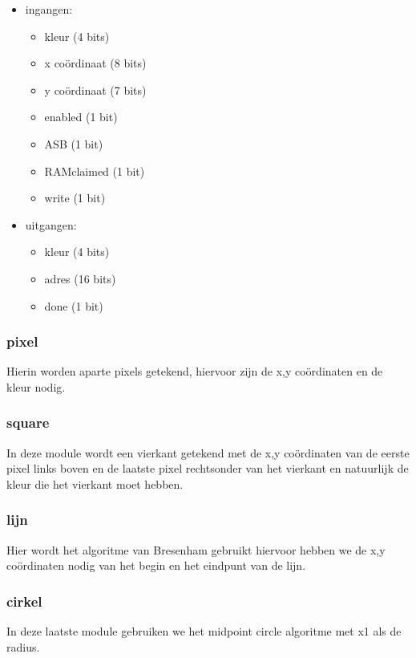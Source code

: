 \begin {itemize}
\item ingangen:
\begin {itemize}
\item kleur (4 bits)
\item x coördinaat (8 bits)
\item y coördinaat (7 bits)
\item enabled (1 bit)
\item ASB (1 bit)
\item RAMclaimed (1 bit)
\item write (1 bit)
\end {itemize}

\item uitgangen:
\begin {itemize}
\item kleur (4 bits)
\item adres (16 bits)
\item done (1 bit)
\end {itemize}
\end{itemize}

\subsubsection { pixel}
Hierin worden aparte pixels getekend, hiervoor zijn de x,y coördinaten en de kleur nodig.

\subsubsection { square}
In deze module wordt een vierkant getekend met de x,y coördinaten van de eerste pixel links boven en de laatste pixel rechtsonder van het vierkant en natuurlijk de kleur die het vierkant moet hebben.

\subsubsection { lijn}
Hier wordt het algoritme van Bresenham gebruikt hiervoor hebben we de x,y coördinaten nodig van het begin en het eindpunt van de lijn.

\subsubsection { cirkel}
In deze laatste module gebruiken we het midpoint circle algoritme met x1 als de radius.

